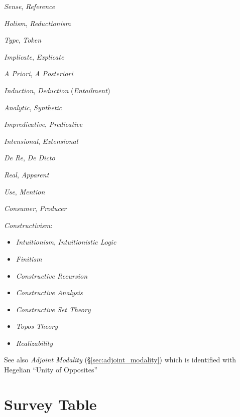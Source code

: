 \emph{Sense}, \emph{Reference}

\emph{Holism}, \emph{Reductionism}

\emph{Type}, \emph{Token}

\emph{Implicate}, \emph{Explicate}

\emph{A Priori}, \emph{A Posteriori}

\emph{Induction}, \emph{Deduction} (\emph{Entailment})

\emph{Analytic}, \emph{Synthetic}

\emph{Impredicative}, \emph{Predicative}

\emph{Intensional}, \emph{Extensional}

\emph{De Re}, \emph{De Dicto}

\emph{Real}, \emph{Apparent}

\emph{Use}, \emph{Mention}

\emph{Consumer}, \emph{Producer}

\emph{Constructivism}:
\begin{itemize}
    \item \emph{Intuitionism}, \emph{Intuitionistic Logic}
    \item \emph{Finitism}
    \item \emph{Constructive Recursion}
    \item \emph{Constructive Analysis}
    \item \emph{Constructive Set Theory}
    \item \emph{Topos Theory}
    \item \emph{Realizability}
\end{itemize}

\fist See also \emph{Adjoint Modality} (\S\ref{sec:adjoint_modality})
which is identified with Hegelian ``Unity of Opposites''



\section{Survey Table}

